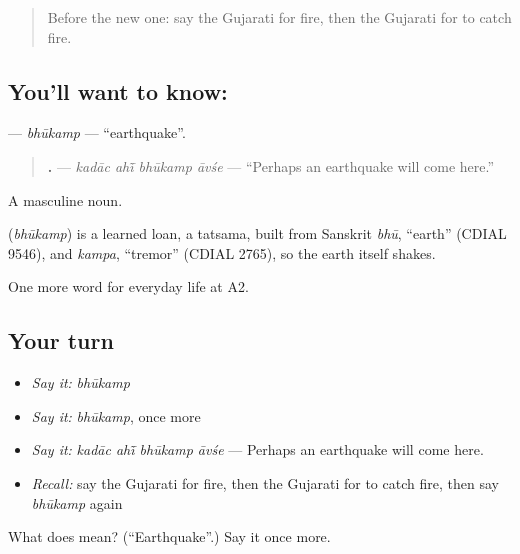 \label{lesson:GU-C221-bhukamp}



\begin{quote}
Before the new one: say the Gujarati for fire, then the Gujarati for to catch fire.
\end{quote}

\subsection*{You'll want to know: }
\textbf{} — \emph{bhūkamp} — \textquotedblleft{}earthquake\textquotedblright{}.

\begin{quote}
\textbf{   .} — \emph{kadāc ahī̃ bhūkamp āvśe} — \textquotedblleft{}Perhaps an earthquake will come here.\textquotedblright{}
\end{quote}

A masculine noun.

\begin{cousinweb}
\textbf{} (\emph{bhūkamp}) is a learned loan, a tatsama, built from Sanskrit \emph{bhū}, \textquotedblleft{}earth\textquotedblright{} (CDIAL 9546), and \emph{kampa}, \textquotedblleft{}tremor\textquotedblright{} (CDIAL 2765), so the earth itself shakes.
\end{cousinweb}

\begin{grammarlens}[title={What you've built}]
One more word for everyday life at A2.
\end{grammarlens}

\subsection*{Your turn}
\begin{itemize}
\raggedright
  \item \emph{Say it:} \emph{bhūkamp}
  \item \emph{Say it:} \emph{bhūkamp}, once more
  \item \emph{Say it:} \emph{kadāc ahī̃ bhūkamp āvśe} — Perhaps an earthquake will come here.
  \item \emph{Recall:} say the Gujarati for fire, then the Gujarati for to catch fire, then say \emph{bhūkamp} again
\end{itemize}

\begin{tcolorbox}[breakable,colback=teal!4,colframe=teal!35!black,title={Before you move on}]
What does  mean? (\textquotedblleft{}Earthquake\textquotedblright{}.) Say it once more.
\end{tcolorbox}
